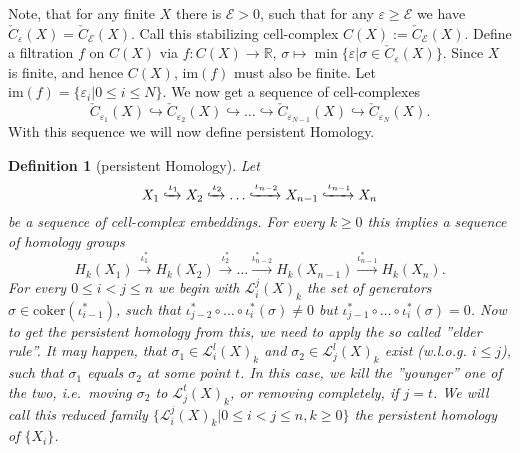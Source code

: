 \documentclass[11pt, a4paper, UKenglish]{article}
\newtheorem{definition}{Definition}
\newcommand{\bR}{\mathbb{R}}
\newcommand{\im}{\textrm{im}}
\newcommand{\coker}{\textrm{coker}}
\begin{document}
    Note, that for any finite $X$ there is  $\mathcal{E}>0$, such that for any $\varepsilon\geq\mathcal{E}$ we have  $\check C_\varepsilon(X) = \check C_\mathcal{E}(X)$.
    Call this stabilizing cell-complex $C(X):=\check C_\mathcal{E}(X)$.
    Define a filtration $f$ on $C(X)$ via $f:C(X)\rightarrow\bR$, $\sigma\mapsto\min\{\varepsilon|\sigma\in \check C_\varepsilon(X)\}$.
    Since $X$ is finite, and hence $C(X)$, $\im(f)$ must also be finite.
    Let $\im(f)=\{\varepsilon_i|0\leq i\leq N\}$.
    We now get a sequence of cell-complexes \[\check C_{\varepsilon_1}(X)\hookrightarrow \check C_{\varepsilon_2}(X)\hookrightarrow \ldots \hookrightarrow \check C_{\varepsilon_{N-1}}(X)\hookrightarrow \check C_{\varepsilon_N}(X).\]
    With this sequence we will now define persistent Homology.

    \begin{definition}[persistent Homology]
        Let \[X_1\xhookrightarrow{\iota_1} X_2\xhookrightarrow{\iota_2} \ldots\xhookrightarrow{\iota_{n-2}} X_{n-1}\xhookrightarrow{\iota_{n-1}} X_n\] be a sequence of cell-complex embeddings.
        For every $k\geq 0$ this implies a sequence of homology groups
        \[H_k(X_1)\xrightarrow{\iota_{1}^*} H_k(X_2)\xrightarrow{\iota_{2}^*}\ldots \xrightarrow{\iota_{n-2}^*} H_k(X_{n-1})\xrightarrow{\iota_{n-1}^*} H_k(X_n).\]
        For every $0\leq i<j\leq n$ we begin with $\mathcal{L}_i^j(X)_k$ the set of generators $\sigma\in\coker(\iota_{i-1}^*)$, such that $\iota_{j-2}^*\circ\ldots\circ\iota_{i}^*(\sigma)\neq0$ but $\iota_{j-1}^*\circ\ldots\circ\iota_{i}^*(\sigma)=0$.
        Now to get the persistent homology from this, we need to apply the so called ''elder rule''.
        It may happen, that $\sigma_1\in\mathcal{L}_i^l(X)_k$ and $\sigma_2\in\mathcal{L}_j^l(X)_k$ exist (w.l.o.g. $i\leq j$), such that $\sigma_1$ equals $\sigma_2$ at some point $t$.
        In this case, we kill the ''younger'' one of the two, i.e.\ moving $\sigma_2$ to $\mathcal{L}_j^t(X)_k$, or removing completely, if $j=t$.
        We will call this reduced family $\{\mathcal{L}_i^j(X)_k|0\leq i<j\leq n,k\geq0\}$ the persistent homology of $\{X_i\}$.
    \end{definition}
\end{document}
